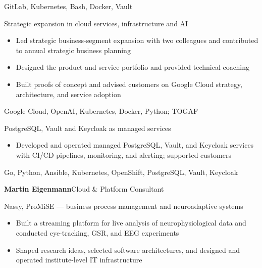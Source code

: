 \documentclass[10pt,a4paper]{altacv}
\begin{document}
GitLab, Kubernetes, Bash, Docker, Vault

\divider

 Strategic expansion in cloud services, infrastructure and AI

\begin{itemize}
\item Led strategic business-segment expansion with two colleagues and contributed to annual strategic business planning
\item Designed the product and service portfolio and provided technical coaching
\item Built proofs of concept and advised customers on Google Cloud strategy, architecture, and service adoption
\end{itemize}

Google Cloud, OpenAI, Kubernetes, Docker, Python; TOGAF

\divider

 PostgreSQL, Vault and Keycloak as managed services
\begin{itemize}
\item Developed and operated managed PostgreSQL, Vault, and Keycloak services with CI/CD pipelines, monitoring, and alerting; supported customers
\end{itemize}
Go, Python, Ansible, Kubernetes, OpenShift, PostgreSQL, Vault, Keycloak


\newpage
\begin{fullwidth}
{\color{emphasis}\large\bfseries Martin Eigenmann}\hfill Cloud \& Platform Consultant\par
\smallskip
\end{fullwidth}

 Nassy, ProMiSE --- business process management and neuroadaptive systems

\begin{itemize}
\item Built a streaming platform for live analysis of neurophysiological data and conducted eye-tracking, GSR, and EEG experiments
\item Shaped research ideas, selected software architectures, and designed and operated institute-level IT infrastructure
\end{itemize}
\end{document}
